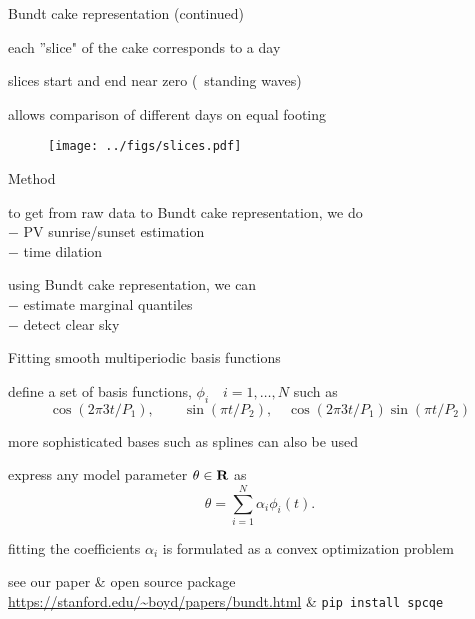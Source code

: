 \documentclass[aspectratio=169,11pt]{beamer}
\begin{document}
\begin{frame}{Bundt cake representation (continued)}
\BIT
\item each ''slice" of the cake corresponds to a day
\item slices start and end near zero (\ie \ standing waves)
\item allows comparison of different days on equal footing
\begin{figure}
\centerline{\texttt{[image: ../figs/slices.pdf]}}
\end{figure}
\EIT
\end{frame}

\begin{frame}{Method}
\BIT
\item to get from raw data to Bundt cake representation, we do \\

$-$ PV sunrise/sunset estimation \\
$-$ time dilation

\vspace{5mm}
\item using Bundt cake representation, we can \\
$-$ estimate marginal quantiles \\
$-$ detect clear sky
\EIT
\end{frame}

\begin{frame}{Fitting smooth multiperiodic basis functions}
\BIT
\item define a set of basis functions, 
$\phi_i \quad i=1,\ldots,N$ such as 
\[
\cos (2\pi 3t/P_1), \qquad 
\sin (\pi t/P_2), \quad
\cos (2\pi 3 t/P_1) \sin (\pi t/P_2)
\]
\item more sophisticated bases such as splines can also be used
\item express any model parameter $\theta \in {\mbox{\bf R}}$ as
\[
	\theta = \sum_{i=1}^N \alpha_i \phi_i(t).
\]
\item fitting the coefficients $\alpha_i$ is formulated 
as a convex optimization problem 

\item see our paper \& open source package 
\url{https://stanford.edu/~boyd/papers/bundt.html}
\&
\texttt{pip install spcqe}
\EIT
\end{frame}

\end{document}
